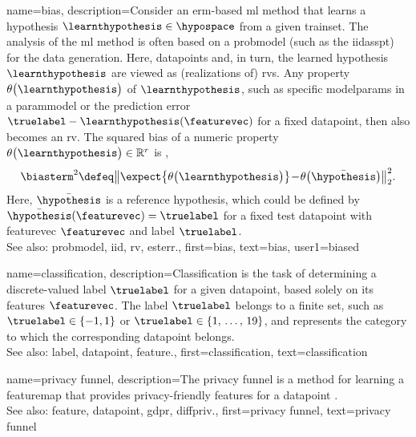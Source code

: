 {name={bias},
	description={Consider an \gls{erm}-based \gls{ml} method that  
		learns a \gls{hypothesis} $\learnthypothesis \in \hypospace$ 
		from a given \gls{trainset}. The analysis of the \gls{ml} method 
		is often based on a \gls{probmodel} (such as the \gls{iidasspt}) 
		for the \gls{data} generation. Here, \glspl{datapoint} and, in turn, 
		the learned \gls{hypothesis} $\learnthypothesis$ are viewed as 
		(\glspl{realization} of) \glspl{rv}. Any property 
		$\theta\big(\learnthypothesis\big)$ of $\learnthypothesis$, 
		such as specific \glspl{modelparam} in a \gls{parammodel} 
		or the \gls{prediction} error $\truelabel - \learnthypothesis(\featurevec)$ 
		for a fixed \gls{datapoint}, then also becomes an \gls{rv}. 
		The squared bias of a numeric property $\theta\big(\learnthypothesis\big) \in \mathbb{R}^{r}$ 
		is \cite{BishopBook}, \cite{hastie01statisticallearning}
		$$\biasterm^{2} \defeq \big\| \expect \big\{ \theta\big(\learnthypothesis\big) \big\}\!-\!\theta\big(\bar{\hypothesis}\big)  \big\|_{2}^{2}.$$
		Here, $\bar{\hypothesis}$ is a reference \gls{hypothesis}, which 
		could be defined by $\bar{\hypothesis}(\featurevec)=\truelabel$ 
		for a fixed test \gls{datapoint} with \gls{featurevec} $\featurevec$ 
		and \gls{label} $\truelabel$. 
					\\ 
		See also: \gls{probmodel}, \gls{iid}, \gls{rv}, \gls{esterr}.},
	first={bias},
	text={bias},
	user1={biased}
}

{name={classification},
	description={Classification is the task of determining a 
 		discrete-valued \gls{label} $\truelabel$ for a given \gls{datapoint}, based solely on its 
 		\glspl{feature} $\featurevec$. The \gls{label} $\truelabel$ belongs to a finite set, such as 
 		$\truelabel \in \{-1,1\}$ or $\truelabel \in \{1, \,\ldots, \,19\}$, and represents the 
 		category to which the corresponding \gls{datapoint} belongs.
				\\ 
		See also: \gls{label}, \gls{datapoint}, \gls{feature}.}, %
	first={classification},
	text={classification} 
}

{name={privacy funnel},
	description={The privacy funnel is a method for learning 
		a \gls{featuremap} that provides privacy-friendly \glspl{feature} for a 
		\gls{datapoint} \cite{PrivacyFunnel}.
				\\ 
		See also: \gls{feature}, \gls{datapoint}, \gls{gdpr}, \gls{diffpriv}.},
 	first={privacy funnel},
	text={privacy funnel} 
}


